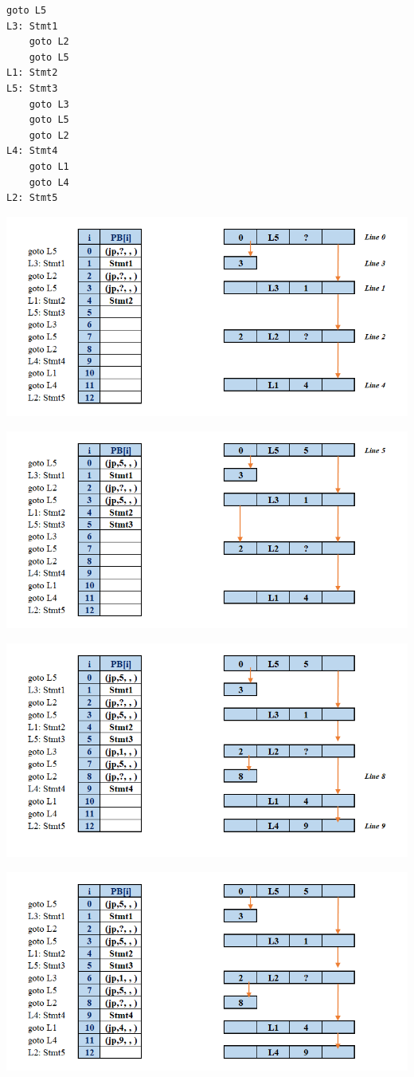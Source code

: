 \setLTR
\begin{lstlisting}
goto L5
L3: Stmt1
	goto L2
	goto L5
L1: Stmt2
L5: Stmt3
	goto L3
	goto L5
	goto L2
L4: Stmt4
	goto L1
	goto L4
L2: Stmt5
\end{lstlisting}
\setRTL

\qquad\qquad\qquad\includegraphics[width=0.7\linewidth]{figs/51.png} 

\qquad\qquad\qquad\includegraphics[width=0.7\linewidth]{figs/52.png} 

\qquad\qquad\qquad\includegraphics[width=0.7\linewidth]{figs/53.png} 

\qquad\qquad\qquad\includegraphics[width=0.7\linewidth]{figs/54.png} 

